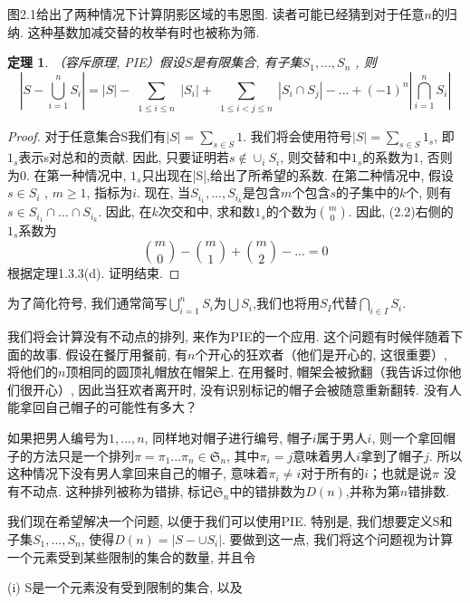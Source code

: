 \documentclass{ctexbook}
\newtheorem{thm}{定理}[section]
\begin{document}
    图2.1给出了两种情况下计算阴影区域的韦恩图. 读者可能已经猜到对于任意$n$的归纳. 这种基数加减交替的枚举有时也被称为筛.
    \begin{thm}
    	（容斥原理, PIE）假设$S$是有限集合, 有子集$S_{1},...,S_{n}$ , 则
    	\begin{equation}
    	|S-\bigcup_{i=1}^{n} S_{i}|=|S|-\sum_{\substack{1\le i\le n}}|S_{i}|+\sum_{\substack{1\le i<j\le n}}|S_{i}\cap S_{j}|-...+(-1)^n|\bigcap_{i=1}^{n} S_{i}|
    	\end{equation}
    \end{thm}
    \begin{proof}
    	对于任意集合S我们有$|S|=\sum_{s\in S}1$. 我们将会使用符号$|S|=\sum_{s\in S}1_{s}$, 即$1_{s}$表示s对总和的贡献. 因此, 只要证明若$s\notin \cup_{i} S_{i}$, 则交替和中$1_{s}$的系数为1, 否则为0. 在第一种情况中, $1_{s}$只出现在|S|,给出了所希望的系数. 在第二种情况中, 假设$s\in S_{i}$
    	, $m\geq 1$, 指标为$i$. 现在, 当$S_{i_{1}},\ldots,S_{i_{k}}$是包含$m$个包含$s$的子集中的$k$个, 则有$s\in S_{i_{1}}\cap \ldots \cap S_{i_{k}}$. 因此, 在$k$次交和中, 求和数$1_{s}$的个数为$\binom{m}{0}$. 因此, (2.2)右侧的$1_{s}$系数为
    	\[
    	\binom{m}{0}-\binom{m}{1}+\binom{m}{2}-...=0
    	\]
    	根据定理1.3.3(d). 证明结束.
    \end{proof}

	为了简化符号, 我们通常简写$\bigcup_{i=1}^n S_{i}$为$\bigcup S_{i}$,我们也将用$S_{I}$代替$\bigcap_{i\in I} S_{i}$.

	我们将会计算没有不动点的排列, 来作为PIE的一个应用. 这个问题有时候伴随着下面的故事. 假设在餐厅用餐前, 有$n$个开心的狂欢者（他们是开心的, 这很重要）, 将他们的$n$顶相同的圆顶礼帽放在帽架上. 在用餐时, 帽架会被掀翻（我告诉过你他们很开心）, 因此当狂欢者离开时, 没有识别标记的帽子会被随意重新翻转. 没有人能拿回自己帽子的可能性有多大？

	如果把男人编号为$1,...,n$, 同样地对帽子进行编号, 帽子$i$属于男人$i$, 则一个拿回帽子的方法只是一个排列$\pi =\pi_{1} ...\pi_{n} \in \mathfrak{S}_{n}$, 其中$\pi_{i} =j$意味着男人$i$拿到了帽子$j$. 所以这种情况下没有男人拿回来自己的帽子, 意味着$\pi_{i} \neq i$对于所有的$i$；也就是说$\pi$ 没有不动点. 这种排列被称为错排, 标记$\mathfrak{S}_{n}$中的错排数为$D(n)$,并称为第$n$错排数.

	我们现在希望解决一个问题, 以便于我们可以使用PIE. 特别是, 我们想要定义S和子集$S_{1},...,S_{n}$, 使得$D(n)=|S-\cup S_{i}|$. 要做到这一点, 我们将这个问题视为计算一个元素受到某些限制的集合的数量, 并且令

	(i) S是一个元素没有受到限制的集合, 以及
\end{document}
